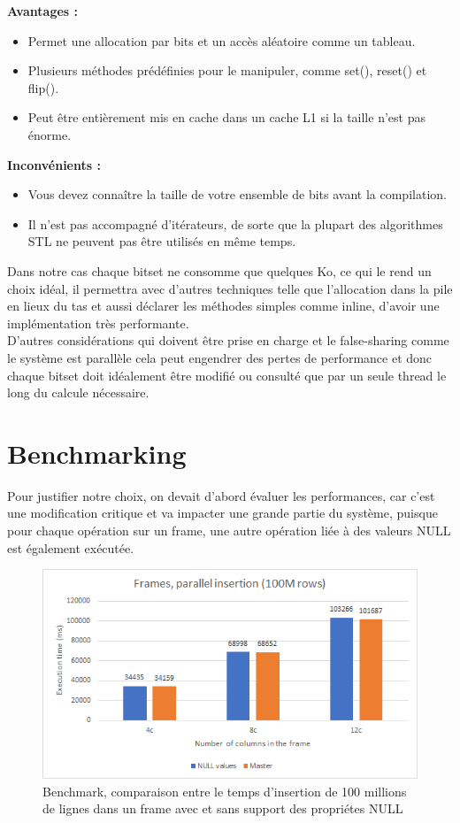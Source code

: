 \textbf{Avantages :}
\begin{itemize}[label=\textbullet]
\item  Permet une allocation par bits et un accès aléatoire comme un tableau.
\item  Plusieurs méthodes prédéfinies pour le manipuler, comme set(), reset() et flip().
\item  Peut être entièrement mis en cache dans un cache L1 si la taille n'est pas énorme.
\end{itemize}

\textbf{Inconvénients :}
\begin{itemize}[label=\textbullet]
\item  Vous devez connaître la taille de votre ensemble de bits avant la compilation.
\item  Il n'est pas accompagné d'itérateurs, de sorte que la plupart des algorithmes STL ne peuvent pas être utilisés en même temps.
\end{itemize}

Dans notre cas chaque bitset ne consomme que quelques Ko, ce qui le rend un choix idéal, il permettra avec d’autres techniques telle que l’allocation dans la pile en lieux du tas et aussi déclarer les méthodes simples comme inline, d’avoir une implémentation très performante.\\
D’autres considérations qui doivent être prise en charge et le false-sharing comme le système est parallèle cela peut engendrer des pertes de performance et donc chaque bitset doit idéalement être modifié ou consulté que par un seule thread le long du calcule nécessaire.

\newpage
\section{Benchmarking}

Pour justifier notre choix, on devait d'abord évaluer les performances, car c’est une modification critique et va impacter une grande partie du système, puisque pour chaque opération sur un frame, une autre opération liée à des valeurs NULL est également exécutée.

\begin{figure}[H]  
  \centering
    \includegraphics[width=1\textwidth]{chapitre4/Figures/BenchmarkPrallel.png}
  \caption{Benchmark, comparaison entre le temps d'insertion de 100 millions de lignes dans un frame avec et sans support des propriétes NULL}
\end{figure}

